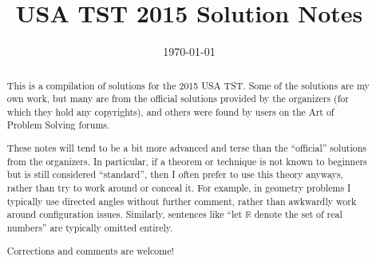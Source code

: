 \documentclass[11pt]{scrartcl}
\begin{document}
\title{USA TST 2015 Solution Notes}
\date{\today}

\maketitle
\begin{abstract}
This is a compilation of solutions
for the 2015 USA TST.
Some of the solutions are my own work,
but many are from the official solutions provided by the organizers
(for which they hold any copyrights),
and others were found by users on the Art of Problem Solving forums.

These notes will tend to be a bit more advanced and terse than the ``official''
solutions from the organizers.
In particular, if a theorem or technique is not known to beginners
but is still considered ``standard'', then I often prefer to
use this theory anyways, rather than try to work around or conceal it.
For example, in geometry problems I typically use directed angles
without further comment, rather than awkwardly work around configuration issues.
Similarly, sentences like ``let $\mathbb{R}$ denote the set of real numbers''
are typically omitted entirely.

Corrections and comments are welcome!
\end{abstract}
\tableofcontents
\newpage

\addtocounter{section}{-1}
\end{document}
